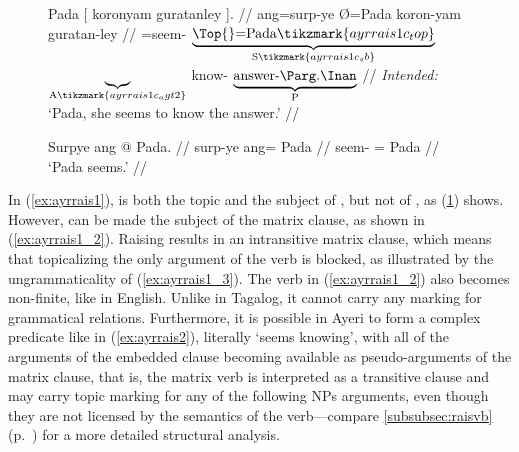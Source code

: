 \begin{figure}
\a\label{ex:ayrrais1_3}\ljudge*%
\begingl[aboveglcskip=1.5em, aboveglftskip=1.75em]
	 Pada \textup{[} {} koronyam guratanley 
		\textup{]}. //
	\glb ang=surp-ye Ø=Pada {} {} koron-yam guratan-ley {} //
	\glc \Aarg{}=seem-\TsgF{}%
		$\underbrace{\text{\Top{}=Pada}%
			\tikzmark{ayrrais1c_top}%
		}_{\text{S}%
			\tikzmark{ayrrais1c_sb}%
		}$
		{}
		$\underbrace{}_{\text{A}%
			\tikzmark{ayrrais1c_agt2}%
		}$
		know-\Ptcp{}
		$\underbrace{\text{answer-\PargI{}}}_{\text{P}}$
		{}
		//
	\glft \textit{Intended:} `Pada, she seems to know the answer.' //
\endgl
{}

\a\label{ex:ayrrais1_4}\ljudge*\begingl
	\gla Surpye ang @ Pada. //
	\glb surp-ye ang= Pada //
	\glc seem-\TsgF{} \Aarg{}= Pada //
	\glft `Pada seems.' //
\endgl

\xe
\end{figure}

In (\ref{ex:ayrrais1}),  is both the topic and the subject of
, but not of , as
(\ref{ex:ayrrais1_4}) shows. However,  can be made the subject
of the matrix clause, as shown in (\ref{ex:ayrrais1_2}). Raising results in an
intransitive matrix clause, which means that topicalizing the only argument of
the verb is blocked, as illustrated by the ungrammaticality of
(\ref{ex:ayrrais1_3}). The verb in (\ref{ex:ayrrais1_2}) also becomes
non-finite, like in English. Unlike in Tagalog, it cannot carry any marking for
grammatical relations. Furthermore, it is possible in Ayeri to form a complex
predicate like  in (\ref{ex:ayrrais2}),
literally `seems knowing', with all of the arguments of the embedded clause
becoming available as pseudo-arguments of the matrix clause, that is, the
matrix verb is interpreted as a transitive clause and may carry topic marking
for any of the following NPs arguments, even though they are not licensed by
the semantics of the verb---compare \autoref{subsubsec:raisvb} 
(p.~\pageref{subsubsec:raisvb}) for a more detailed structural analysis.

